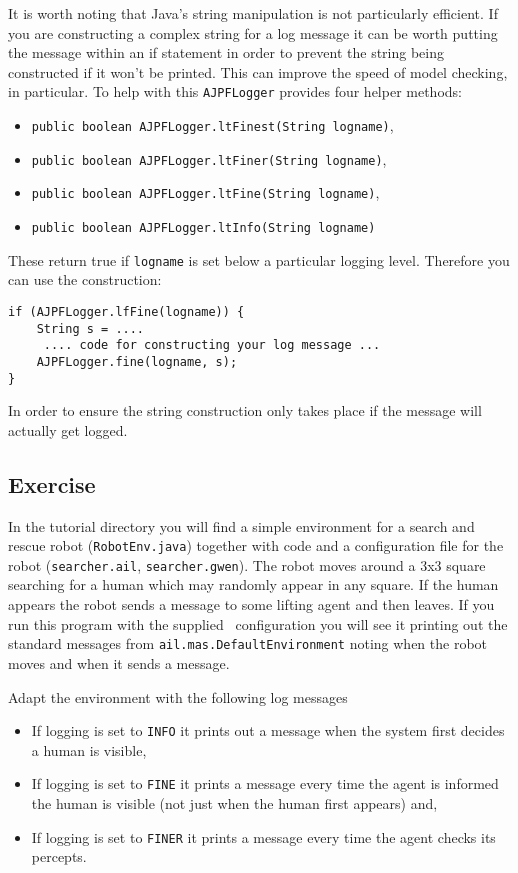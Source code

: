 \documentclass[a4]{article}
\begin{document}
It is worth noting that Java's string manipulation is not particularly efficient.  If you are constructing a complex string for a log message it can be worth putting the message within an if statement in order to prevent the string being constructed if it won't be printed.  This can improve the speed of model checking, in particular.  To help with this \texttt{AJPFLogger} provides four helper methods:
\begin{itemize}
\item  \texttt{public boolean AJPFLogger.ltFinest(String logname)}, 
\item \texttt{public boolean AJPFLogger.ltFiner(String logname)}, 
\item \texttt{public boolean AJPFLogger.ltFine(String logname)}, 
\item \texttt{public boolean AJPFLogger.ltInfo(String logname)} 
\end{itemize}
These return true if \texttt{logname} is set below a particular logging level.  Therefore you can use the construction:

\begin{verbatim}
if (AJPFLogger.lfFine(logname)) {
    String s = ....
     .... code for constructing your log message ...
    AJPFLogger.fine(logname, s);
}
\end{verbatim}
In order to ensure the string construction only takes place if the message will actually get logged.

\subsection{Exercise}
In the tutorial directory you will find a simple environment for a search and rescue robot (\texttt{RobotEnv.java}) together with code and a configuration file for the robot (\texttt{searcher.ail}, \texttt{searcher.gwen}).  The robot moves around a 3x3 square searching for a human which may randomly appear in any square.  If the human appears the robot sends a message to some lifting agent and then leaves.  If you run this program with the supplied \ail\ configuration you will see it printing out the standard messages from \texttt{ail.mas.DefaultEnvironment} noting when the robot moves and when it sends a message.

Adapt the environment with the following log messages
\begin{itemize}
\item If logging is set to \texttt{INFO} it prints out a message when the system first decides a human is visible, 
\item If logging is set to \texttt{FINE} it prints a message every time the agent is informed the human is visible (not just when the human first appears) and,
\item If logging is set to \texttt{FINER} it prints a message every time the agent checks its percepts.
\end{itemize}
\end{document}
